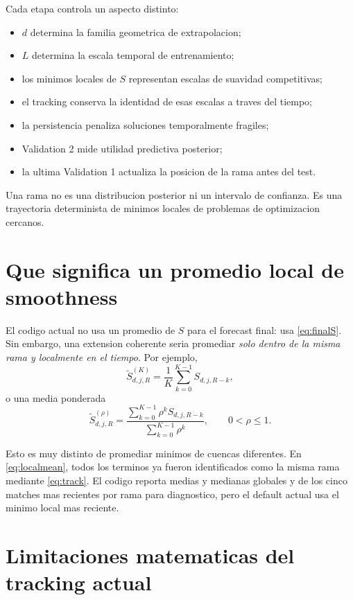 \documentclass[11pt]{article}
\begin{document}
Cada etapa controla un aspecto distinto:
\begin{itemize}[leftmargin=2em]
    \item \(d\) determina la familia geometrica de extrapolacion;
    \item \(L\) determina la escala temporal de entrenamiento;
    \item los minimos locales de \(S\) representan escalas de suavidad
    competitivas;
    \item el tracking conserva la identidad de esas escalas a traves del tiempo;
    \item la persistencia penaliza soluciones temporalmente fragiles;
    \item Validation 2 mide utilidad predictiva posterior;
    \item la ultima Validation 1 actualiza la posicion de la rama antes del test.
\end{itemize}

Una rama no es una distribucion posterior ni un intervalo de confianza. Es una
trayectoria determinista de minimos locales de problemas de optimizacion
cercanos.

\section{Que significa un promedio local de smoothness}

El codigo actual no usa un promedio de \(S\) para el forecast final: usa
\eqref{eq:finalS}. Sin embargo, una extension coherente seria promediar
\emph{solo dentro de la misma rama y localmente en el tiempo}. Por ejemplo,
\begin{equation}
\widetilde S_{d,j,R}^{(K)}
=
\frac{1}{K}
\sum_{k=0}^{K-1}
S_{d,j,R-k},
\label{eq:localmean}
\end{equation}
o una media ponderada
\begin{equation}
\widetilde S_{d,j,R}^{(\rho)}
=
\frac{
\sum_{k=0}^{K-1}
\rho^k S_{d,j,R-k}
}{
\sum_{k=0}^{K-1}\rho^k
},
\qquad 0<\rho\le1.
\label{eq:weightedmean}
\end{equation}

Esto es muy distinto de promediar minimos de cuencas diferentes. En
\eqref{eq:localmean}, todos los terminos ya fueron identificados como la misma
rama mediante \eqref{eq:track}. El codigo reporta medias y medianas globales y
de los cinco matches mas recientes por rama para diagnostico, pero el default
actual usa el minimo local mas reciente.

\section{Limitaciones matematicas del tracking actual}
\end{document}
